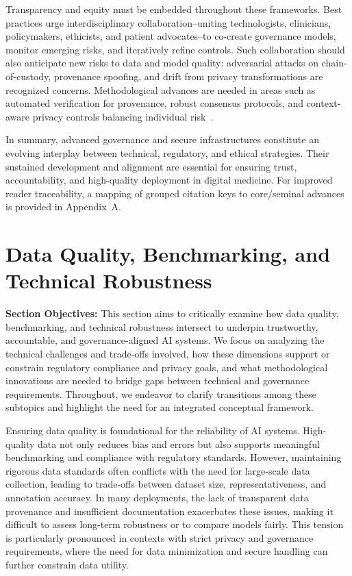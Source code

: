 \documentclass[sigconf]{acmart}
\begin{document}
Transparency and equity must be embedded throughout these frameworks. Best practices urge interdisciplinary collaboration--uniting technologists, clinicians, policymakers, ethicists, and patient advocates--to co-create governance models, monitor emerging risks, and iteratively refine controls. Such collaboration should also anticipate new risks to data and model quality: adversarial attacks on chain-of-custody, provenance spoofing, and drift from privacy transformations are recognized concerns. Methodological advances are needed in areas such as automated verification for provenance, robust consensus protocols, and context-aware privacy controls balancing individual risk~\cite{ref91, ref51}.

In summary, advanced governance and secure infrastructures constitute an evolving interplay between technical, regulatory, and ethical strategies. Their sustained development and alignment are essential for ensuring trust, accountability, and high-quality deployment in digital medicine. For improved reader traceability, a mapping of grouped citation keys to core/seminal advances is provided in Appendix~A.

\section{Data Quality, Benchmarking, and Technical Robustness}

\textbf{Section Objectives:} This section aims to critically examine how data quality, benchmarking, and technical robustness intersect to underpin trustworthy, accountable, and governance-aligned AI systems. We focus on analyzing the technical challenges and trade-offs involved, how these dimensions support or constrain regulatory compliance and privacy goals, and what methodological innovations are needed to bridge gaps between technical and governance requirements. Throughout, we endeavor to clarify transitions among these subtopics and highlight the need for an integrated conceptual framework.

Ensuring data quality is foundational for the reliability of AI systems. High-quality data not only reduces bias and errors but also supports meaningful benchmarking and compliance with regulatory standards. However, maintaining rigorous data standards often conflicts with the need for large-scale data collection, leading to trade-offs between dataset size, representativeness, and annotation accuracy. In many deployments, the lack of transparent data provenance and insufficient documentation exacerbates these issues, making it difficult to assess long-term robustness or to compare models fairly. This tension is particularly pronounced in contexts with strict privacy and governance requirements, where the need for data minimization and secure handling can further constrain data utility.
\end{document}
